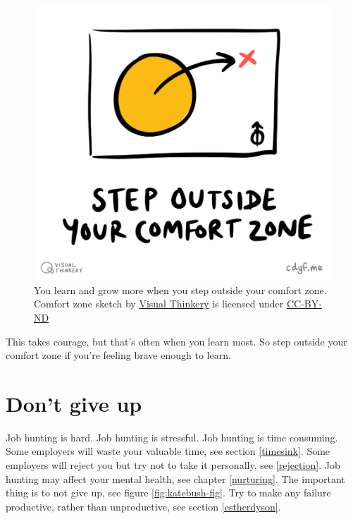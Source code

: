 \documentclass[
]{book}
\begin{document}
\begin{figure}

{\centering \includegraphics[width=0.75\linewidth]{images/Step outside your comfort zone} 

}

\caption{You learn and grow more when you step outside your comfort zone. Comfort zone sketch by \href{https://visualthinkery.com}{Visual Thinkery} is licensed under \href{https://creativecommons.org/licenses/by-nd/4.0/}{CC-BY-ND}}\label{fig:comfortzone-fig}
\end{figure}



This takes courage, but that's often when you learn most. So step outside your comfort zone if you're feeling brave enough to learn.

\hypertarget{nevergiveup}{%
\section{Don't give up}\label{nevergiveup}}

Job hunting is hard. Job hunting is stressful. Job hunting is time consuming. Some employers will waste your valuable time, see section \ref{timesink}. Some employers will reject you but try not to take it personally, see \ref{rejection}. Job hunting may affect your mental health, see chapter \ref{nurturing}. The important thing is to not give up, see figure \ref{fig:katebush-fig}. Try to make any failure productive, rather than unproductive, see section \ref{estherdyson}.
\end{document}
